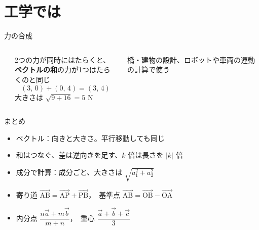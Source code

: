 \documentclass[aspectratio=169]{beamer}
\begin{document}
\section{工学では}

\begin{frame}{力の合成}
  \begin{columns}[c]
      \begin{center}
        
      \end{center}
      2つの力が同時にはたらくと、\\
      \textbf{ベクトルの和}の力が1つはたらくのと同じ
      \[
        (3,\, 0) + (0,\, 4) = (3,\, 4)
      \]
      大きさは $\sqrt{9 + 16} = 5$ N
      \medskip

      {\small 橋・建物の設計、ロボットや車両の運動の計算で使う}
  \end{columns}
\end{frame}

\begin{frame}{まとめ}
  \begin{itemize}
    \item ベクトル：向きと大きさ。平行移動しても同じ
    \item 和はつなぐ、差は逆向きを足す、$k$ 倍は長さを $|k|$ 倍
    \item 成分で計算：成分ごと、大きさは $\sqrt{a_1^2 + a_2^2}$
    \item 寄り道 $\overrightarrow{\mathrm{AB}} = \overrightarrow{\mathrm{AP}} + \overrightarrow{\mathrm{PB}}$，\
          基準点 $\overrightarrow{\mathrm{AB}} = \overrightarrow{\mathrm{OB}} - \overrightarrow{\mathrm{OA}}$
    \item 内分点 $\dfrac{n\vec{a} + m\vec{b}}{m + n}$，\ 重心 $\dfrac{\vec{a} + \vec{b} + \vec{c}}{3}$
  \end{itemize}
  \bigskip
\end{frame}
\end{document}
